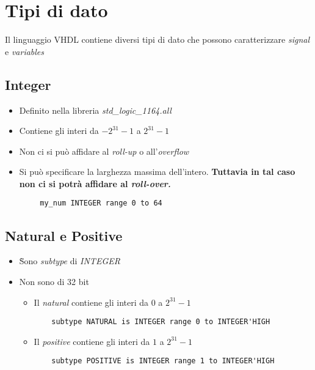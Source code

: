\documentclass{article}
\begin{document}
\newpage

\section{Tipi di dato}
Il linguaggio VHDL contiene diversi tipi di dato che possono caratterizzare \textit{signal} e \textit{variables}
\subsection{Integer}
\begin{itemize}
  \item Definito nella libreria \textit{std\_logic\_1164.all}
  \item Contiene gli interi da \(-2^{31}-1\) a \(2^{31}-1\)
  \item Non ci si può affidare al \textit{roll-up} o all'\textit{overflow}
  \item Si può specificare la larghezza massima dell'intero. \textbf{Tuttavia in tal caso non ci si potrà affidare al \textit{roll-over.}}
\end{itemize}
\begin{verbatim}
        my_num INTEGER range 0 to 64
\end{verbatim}
\subsection{Natural e Positive}
\begin{itemize}
  \item \`Sono \textit{subtype} di \textit{INTEGER}
  \item Non sono di 32 bit
        \begin{itemize}
          \item Il \textit{natural} contiene gli interi da \(0\) a \(2^{31}-1\)
                \begin{verbatim}
    subtype NATURAL is INTEGER range 0 to INTEGER'HIGH
 \end{verbatim}
          \item Il \textit{positive} contiene gli interi da \(1\) a \(2^{31}-1\)
                \begin{verbatim}
    subtype POSITIVE is INTEGER range 1 to INTEGER'HIGH
 \end{verbatim}
        \end{itemize}
\end{itemize}
\end{document}
